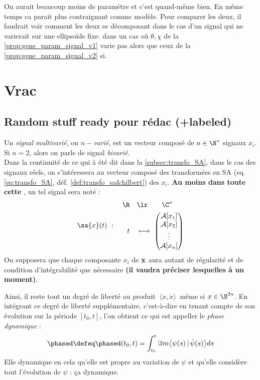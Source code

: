On aurait beaucoup moins de paramètre et c'est quand-même bien. En même temps ca parait plus contraignant comme modèle. Pour comparer les deux, il faudrait voir comment les deux se décomposant dans le cas d'un signal qui ne varierait sur une ellipsoïde fixe. \ie dans un cas où $\theta,\chi$ de la \cref{prop:gene_param_signal_v1} varie pas alors que ceux de la \cref{prop:gene_param_signal_v2} si.



\section{Vrac}

\subsection{Random  stuff ready pour rédac (+labeled)}

\begin{definition}\label{def:signal_multivar}
	Un \emph{signal multivarié}, ou \emph{$n-$varié}, est un vecteur composé de $n\in\N^*$ signaux $x_i$. Si $n=2$, alors on parle de signal \emph{bivarié}.
	\\
	Dans la continuité de ce qui à été dit dans la \cref{subsec:transfo_SA}, dans le cas des signaux réels, on s'intéressera au vecteur composé des transformées en SA (eq. \ref{eq:transfo_SA}, déf. \ref{def:transfo_sa&hilbert}) des $x_i$.
	\textbf{Au moins dans toute cette }, un tel signal sera noté :
	\[\sa{x}(t)\ :\quad \begin{aligned} 
		\R\quad &\lr\qquad \C^n \\t\quad &\longmapsto\ \begin{pmatrix} \mathcal{A}[x_1] \\ 
			\mathcal{A}[x_2] \\ \vdots \\ \mathcal{A}[x_n] \end{pmatrix}
	\end{aligned} \]
	On supposera que chaque composante $x_i$ de $\bf{x}$ aura autant de régularité et de condition d'intégrabilité que nécessaire \textbf{(il vaudra préciser lesquelles à un moment)}.
\end{definition}

\begin{definition}\label{def:phase_dyn}
	Ainsi, il reste tout un degré de liberté au produit $\ \langle x, \dot{x} \rangle\ $ même si $x\in\S^{2n}$. En intégrant ce degré de liberté supplémentaire, c'est-à-dire en tenant compte de son évolution sur la période $[t_0,t]$, l'on obtient ce qui est appeller le \emph{phase dynamique} :
	\[\phased \defeq \phased(t_0,t) = \int_{t_0}^t \Im m \big\langle \psi(s) \, |\, \dot{\psi}(s) \big\rangle ds\]
	Elle dynamique en cela qu'elle est propre au variation de $\psi$ et qu'elle considère tout l'évolution de $\psi$ : ça dynamique.
\end{definition}


